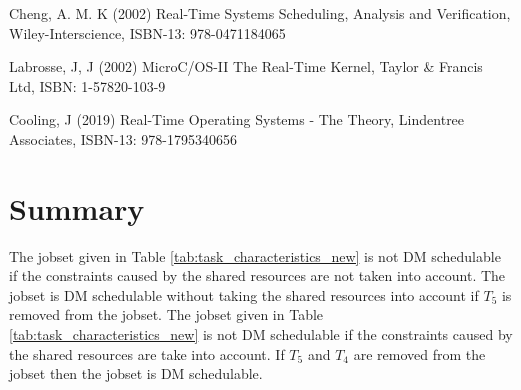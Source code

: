 \documentclass[10pt]{article}
\begin{document}
\begin{thebibliography}{9} %

 Cheng, A. M. K (2002) Real-Time Systems Scheduling, Analysis and Verification, Wiley-Interscience, ISBN-13: 978-0471184065

 Labrosse, J, J (2002) MicroC/OS-II The Real-Time Kernel, Taylor \& Francis Ltd, ISBN: 1-57820-103-9

 Cooling, J (2019) Real-Time Operating Systems - The Theory, Lindentree Associates, ISBN-13: 978-1795340656

\end{thebibliography}

\newpage
\section{Summary}

The jobset given in Table \ref{tab:task_characteristics_new} is not DM schedulable if the constraints caused by the shared resources are not taken into account.
The jobset is DM schedulable without taking the shared resources into account if $T_5$ is removed from the jobset.
The jobset given in Table \ref{tab:task_characteristics_new} is not DM schedulable if the constraints caused by the shared resources are take into account.
If $T_5$ and $T_4$ are removed from the jobset then the jobset is DM schedulable.
\end{document}
